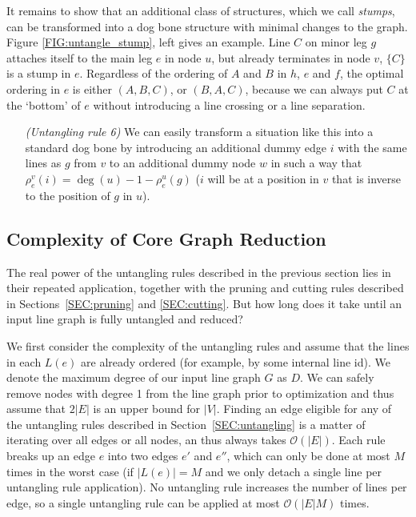 \documentclass[format=acmsmall, review=false, screen=true]{acmart}
\begin{document}
It remains to show that an additional class of structures, which we call \emph{stumps}, can be transformed into a dog bone structure with minimal changes to the graph. Figure \ref{FIG:untangle_stump}, left gives an example. Line $C$ on minor leg $g$ attaches itself to the main leg $e$ in node $u$, but already terminates in node $v$, $\{C\}$ is a stump in $e$. Regardless of the ordering of $A$ and $B$ in $h$, $e$ and $f$, the optimal ordering in $e$ is either $(A, B, C)$, or $(B, A, C)$, because we can always put $C$ at the `bottom' of $e$ without introducing a line crossing or a line separation.
\begin{enumerate}[parsep=0.5mm, wide, labelwidth=0mm, itemindent=2.3mm]
  \setlength\itemsep{1pt}
  \item[\emph{(Untangling rule 6)}]We can easily transform a situation like this into a standard dog bone by introducing an additional dummy edge $i$ with the same lines as $g$ from $v$ to an additional dummy node $w$ in such a way that $\rho^v_e(i) = \deg(u) - 1 - \rho^u_e(g)$ ($i$ will be at a position in $v$ that is inverse to the position of $g$ in $u$). 
\end{enumerate}

\subsection{Complexity of Core Graph Reduction}

The real power of the untangling rules described in the previous section lies in their repeated application, together with the pruning and cutting rules described in Sections~\ref{SEC:pruning} and \ref{SEC:cutting}. But how long does it take until an input line graph is fully untangled and reduced?

We first consider the complexity of the untangling rules and assume that the lines in each $L(e)$ are already ordered (for example, by some internal line id). We denote the maximum degree of our input line graph $G$ as $D$. We can safely remove nodes with degree 1 from the line graph prior to optimization and thus assume that $2|E|$ is an upper bound for $|V|$. Finding an edge eligible for any of the untangling rules described in Section~\ref{SEC:untangling} is a matter of iterating over all edges or all nodes, an thus always takes $\mathcal{O}(|E|)$. Each rule breaks up an edge $e$ into two edges $e'$ and $e''$, which can only be done at most $M$ times in the worst case (if $|L(e)| = M$ and we only detach a single line per untangling rule application). No untangling rule increases the number of lines per edge, so a single untangling rule can be applied at most $\mathcal{O}(|E|M)$ times.
\end{document}
